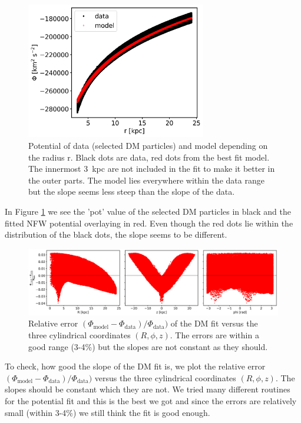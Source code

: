 \begin{figure}
\captionsetup{format=plain}
    \centering
    \includegraphics[width=0.7\textwidth]{plots/Auriga/phi_model_and_data_snap_127.png}
    \caption{Potential of data (selected \ac{DM} particles) and model depending on the radius r. Black dots are data, red dots from the best fit model. The innermost \SI{3}{kpc} are not included in the fit to make it better in the outer parts. The model lies everywhere within the data range but the slope seems less steep than the slope of the data.}
    \label{fig:potential_best_fit}
\end{figure}
In Figure \ref{fig:potential_best_fit} we see the 'pot' value of the selected \ac{DM} particles in black and the fitted \ac{NFW} potential overlaying in red. Even though the red dots lie within the distribution of the black dots, the slope seems to be different.
\begin{figure}
\captionsetup{format=plain}
    \centering
    \includegraphics[width=\textwidth]{plots/Auriga/rel_phi_error_snap_127.png}
    \caption{Relative error $(\Phi_\mathrm{model} - \Phi_\mathrm{data})/\Phi_\mathrm{data})$ of the \ac{DM} fit versus the three cylindrical coordinates $(R, \phi, z)$. The errors are within a good range (3-4\%) but the slopes are not constant as they should.}
    \label{fig:potential_fit_rel_errors}
\end{figure}
To check, how good the slope of the \ac{DM} fit is, we plot the relative error $(\Phi_\mathrm{model} - \Phi_\mathrm{data})/\Phi_\mathrm{data})$ versus the three cylindrical coordinates $(R, \phi, z)$. The slopes should be constant which they are not. We tried many different routines for the potential fit and this is the best we got and since the errors are relatively small (within 3-4\%) we still think the fit is good enough.

